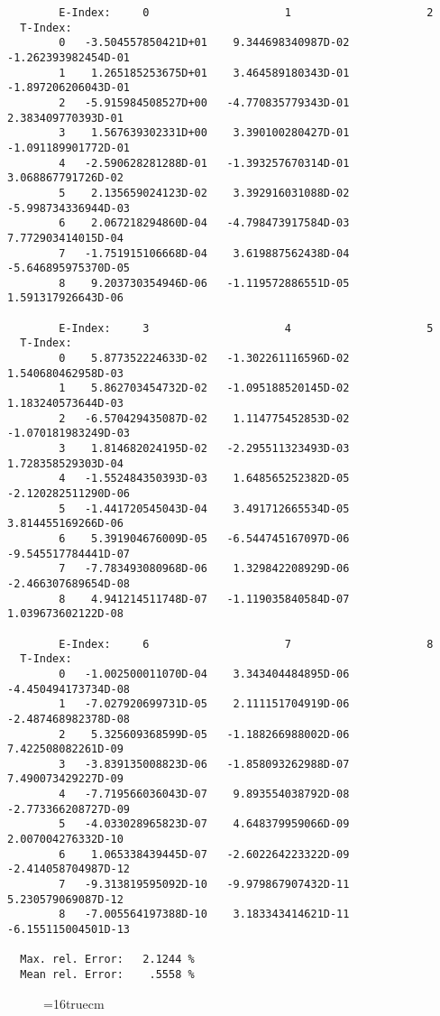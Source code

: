 \documentclass[12pt,dvipdfmx]{article}
\begin{document}
\begin{small}\begin{verbatim}
        E-Index:     0                     1                     2
  T-Index:
        0   -3.504557850421D+01    9.344698340987D-02   -1.262393982454D-01
        1    1.265185253675D+01    3.464589180343D-01   -1.897206206043D-01
        2   -5.915984508527D+00   -4.770835779343D-01    2.383409770393D-01
        3    1.567639302331D+00    3.390100280427D-01   -1.091189901772D-01
        4   -2.590628281288D-01   -1.393257670314D-01    3.068867791726D-02
        5    2.135659024123D-02    3.392916031088D-02   -5.998734336944D-03
        6    2.067218294860D-04   -4.798473917584D-03    7.772903414015D-04
        7   -1.751915106668D-04    3.619887562438D-04   -5.646895975370D-05
        8    9.203730354946D-06   -1.119572886551D-05    1.591317926643D-06

        E-Index:     3                     4                     5
  T-Index:
        0    5.877352224633D-02   -1.302261116596D-02    1.540680462958D-03
        1    5.862703454732D-02   -1.095188520145D-02    1.183240573644D-03
        2   -6.570429435087D-02    1.114775452853D-02   -1.070181983249D-03
        3    1.814682024195D-02   -2.295511323493D-03    1.728358529303D-04
        4   -1.552484350393D-03    1.648565252382D-05   -2.120282511290D-06
        5   -1.441720545043D-04    3.491712665534D-05    3.814455169266D-06
        6    5.391904676009D-05   -6.544745167097D-06   -9.545517784441D-07
        7   -7.783493080968D-06    1.329842208929D-06   -2.466307689654D-08
        8    4.941214511748D-07   -1.119035840584D-07    1.039673602122D-08

        E-Index:     6                     7                     8
  T-Index:
        0   -1.002500011070D-04    3.343404484895D-06   -4.450494173734D-08
        1   -7.027920699731D-05    2.111151704919D-06   -2.487468982378D-08
        2    5.325609368599D-05   -1.188266988002D-06    7.422508082261D-09
        3   -3.839135008823D-06   -1.858093262988D-07    7.490073429227D-09
        4   -7.719566036043D-07    9.893554038792D-08   -2.773366208727D-09
        5   -4.033028965823D-07    4.648379959066D-09    2.007004276332D-10
        6    1.065338439445D-07   -2.602264223322D-09   -2.414058704987D-12
        7   -9.313819595092D-10   -9.979867907432D-11    5.230579069087D-12
        8   -7.005564197388D-10    3.183343414621D-11   -6.155115004501D-13

  Max. rel. Error:   2.1244 %
  Mean rel. Error:    .5558 %

\end{verbatim}\end{small}
\begin{figure} \label{2.2.5fl}
\epsfxsize=16truecm
\end{figure}
\newpage
\end{document}
